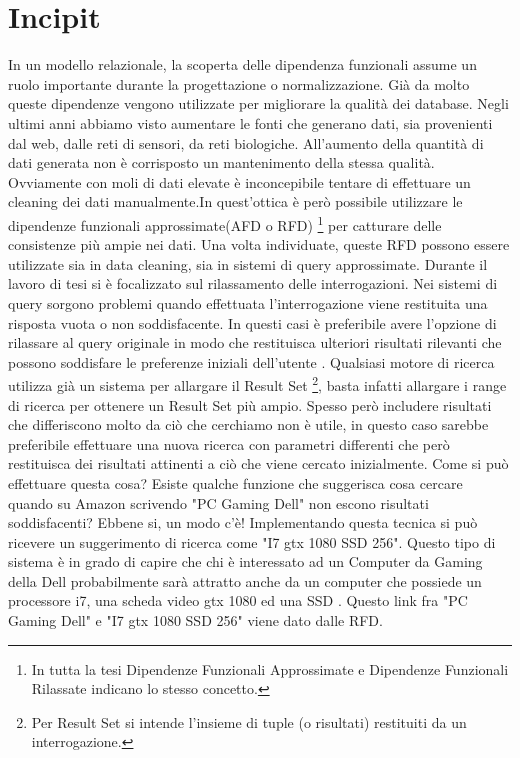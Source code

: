 \section{Incipit}

In un modello relazionale, la scoperta delle dipendenza funzionali assume un ruolo importante durante la progettazione o normalizzazione. Già da molto queste dipendenze vengono utilizzate per migliorare la qualità dei database.
Negli ultimi anni abbiamo visto aumentare le fonti che generano dati, sia provenienti dal web, dalle reti di sensori, da reti biologiche. All’aumento della quantità di dati generata non è corrisposto un mantenimento della stessa qualità. Ovviamente con moli di dati elevate è inconcepibile tentare di effettuare un cleaning dei dati manualmente.In quest’ottica è però possibile utilizzare le dipendenze funzionali approssimate(AFD o RFD) \footnote{In tutta la tesi Dipendenze Funzionali Approssimate e Dipendenze Funzionali Rilassate indicano lo stesso concetto.} per catturare delle consistenze più ampie nei dati.
Una volta individuate, queste RFD possono essere utilizzate sia in data cleaning, sia in sistemi di query approssimate. Durante il lavoro di tesi si è focalizzato sul rilassamento delle interrogazioni. Nei sistemi di query sorgono problemi quando effettuata l'interrogazione viene restituita una risposta vuota o non soddisfacente. In questi casi è preferibile avere l'opzione di rilassare al query originale in modo che restituisca ulteriori risultati rilevanti che possono soddisfare le preferenze iniziali dell'utente . Qualsiasi motore di ricerca utilizza già un sistema per allargare il Result Set \footnote{Per Result Set si intende l'insieme di tuple (o risultati) restituiti da un interrogazione.}, basta infatti allargare i range di ricerca per ottenere un Result Set più ampio. Spesso però includere risultati che differiscono molto da ciò che cerchiamo non è utile, in questo caso sarebbe preferibile effettuare una nuova ricerca con parametri differenti che però restituisca dei risultati attinenti a ciò che viene cercato inizialmente. Come si può effettuare questa cosa? Esiste qualche funzione che suggerisca cosa cercare quando su Amazon scrivendo "PC Gaming Dell" non escono risultati soddisfacenti? Ebbene si, un modo c'è! Implementando questa tecnica si può ricevere un suggerimento di ricerca come "I7 gtx 1080 SSD 256". Questo tipo di sistema è in grado di capire che chi è interessato ad un Computer da Gaming della Dell probabilmente sarà attratto anche da un computer che possiede un processore i7, una scheda video gtx 1080 ed una SSD .
Questo link fra "PC Gaming Dell" e "I7 gtx 1080 SSD 256" viene dato dalle RFD.

